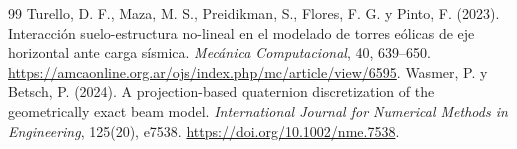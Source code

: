 \documentclass[11pt,a4paper,oneside]{report}
\begin{document}
\begin{thebibliography}{99}
 Turello, D. F., Maza, M. S., Preidikman, S., Flores, F. G. y Pinto, F. (2023). Interacción suelo-estructura no-lineal en el modelado de torres eólicas de eje horizontal ante carga sísmica. \emph{Mecánica Computacional}, 40, 639--650. \url{https://amcaonline.org.ar/ojs/index.php/mc/article/view/6595}.
 Wasmer, P. y Betsch, P. (2024). A projection-based quaternion discretization of the geometrically exact beam model. \emph{International Journal for Numerical Methods in Engineering}, 125(20), e7538. \url{https://doi.org/10.1002/nme.7538}.
\end{thebibliography}
\end{document}
